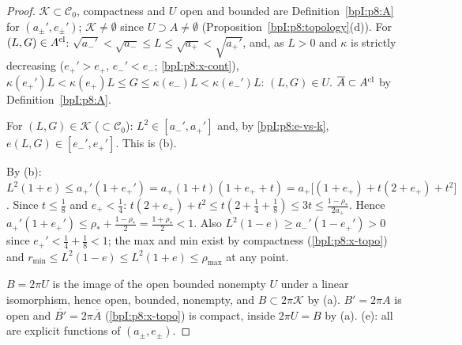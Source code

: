 \begin{proof}
\label{stepI:p8:sr-incl} $\mathcal K\subset\mathcal C_0$, compactness and $U$ open and bounded are Definition~\ref{bpI:p8:A} for $(a_\pm',e_\pm')$; $\mathcal K\ne\emptyset$ since $U\supset A\ne\emptyset$ (Proposition~\ref{bpI:p8:topology}(d)). For $(L,G)\in A^{\rm cl}$: $\sqrt{a_-'}<\sqrt{a_-}\le L\le\sqrt{a_+}<\sqrt{a_+'}$, and, as $L>0$ and $\kappa$ is strictly decreasing ($e_+'>e_+$, $e_-'<e_-$; \ref{bpI:p8:x-cont}), $\kappa(e_+')L<\kappa(e_+)L\le G\le\kappa(e_-)L<\kappa(e_-')L$: $(L,G)\in U$. $\overline A\subset A^{\rm cl}$ by Definition~\ref{bpI:p8:A}.

\label{stepI:p8:sr-elements} For $(L,G)\in\mathcal K$ ($\subset\mathcal C_0$): $L^2\in[a_-',a_+']$ and, by \eqref{bpI:p8:e-vs-k}, $e(L,G)\in[e_-',e_+']$. This is (b).

\label{stepI:p8:sr-radii} By (b): $L^2(1+e)\le a_+'(1+e_+')=a_+(1+t)(1+e_++t)=a_+\bigl[(1+e_+)+t(2+e_+)+t^2\bigr]$. Since $t\le\tfrac18$ and $e_+<\tfrac14$: $t(2+e_+)+t^2\le t(2+\tfrac14+\tfrac18)\le3t\le\frac{1-\rho_*}{2a_+}$. Hence $a_+'(1+e_+')\le\rho_*+\frac{1-\rho_*}2=\frac{1+\rho_*}2<1$. Also $L^2(1-e)\ge a_-'(1-e_+')>0$ since $e_+'<\tfrac14+\tfrac18<1$; the max and min exist by compactness (\ref{bpI:p8:x-topo}) and $r_{\min}\le L^2(1-e)\le L^2(1+e)\le\rho_{\max}$ at any point.

\label{stepI:p8:sr-B} $B=2\pi U$ is the image of the open bounded nonempty $U$ under a linear isomorphism, hence open, bounded, nonempty, and $B\subset2\pi\mathcal K$ by (a). $B'=2\pi A$ is open and $\overline{B'}=2\pi\overline A$ (\ref{bpI:p8:x-topo}) is compact, inside $2\pi U=B$ by (a). (e): all are explicit functions of $(a_\pm,e_\pm)$.
\end{proof}

